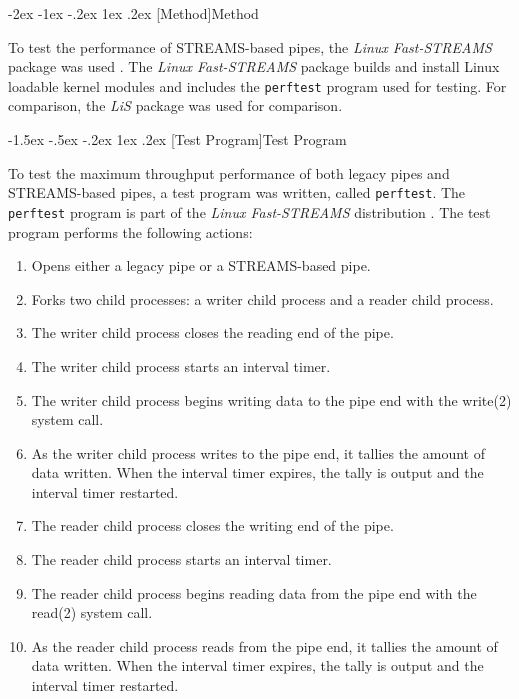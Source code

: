 \documentclass[letterpaper,final,notitlepage,twocolumn,10pt,twoside]{article}
\makeatletter
\renewcommand\section{\@startsection {section}{1}{\z@}%
                                   {-2ex \@plus -1ex \@minus -.2ex}%
                                   {1ex \@plus .2ex}%
                                   {\normalfont\large\bfseries}}
\renewcommand\subsection{\@startsection{subsection}{2}{\z@}%
                                     {-1.5ex \@plus -.5ex \@minus -.2ex}%
                                     {1ex \@plus .2ex}%
                                     {\normalfont\normalsize\bfseries}}
\makeatother
\begin{document}
\section[Method]{Method}

To test the performance of STREAMS-based pipes, the \textsl{Linux Fast-STREAMS} package was used
\cite[]{LfS}.  The \textsl{Linux Fast-STREAMS} package builds and install Linux loadable kernel
modules and includes the
\texttt{perftest} program used for testing.  For comparison, the \textsl{LiS} package \cite[]{LiS}
was used for comparison.

\subsection[Test Program]{Test Program}

To test the maximum throughput performance of both legacy pipes and STREAMS-based pipes, a test
program was written, called \texttt{perftest}.  The \texttt{perftest} program is part of the
\textsl{Linux Fast-STREAMS} distribution \cite[]{LfS}.  The test program performs the following
actions:

\begin{enumerate}

\item Opens either a legacy pipe or a STREAMS-based pipe.

\item Forks two child processes: a writer child process and a reader child process.

\item The writer child process closes the reading end of the pipe.

\item The writer child process starts an interval timer.

\item The writer child process begins writing data to the pipe end with the write(2) system call.

\item As the writer child process writes to the pipe end, it tallies the amount of data written.
When the interval timer expires, the tally is output and the interval timer restarted.

\item The reader child process closes the writing end of the pipe.

\item The reader child process starts an interval timer.

\item The reader child process begins reading data from the pipe end with the read(2) system call.

\item As the reader child process reads from the pipe end, it tallies the amount of data written.
When the interval timer expires, the tally is output and the interval timer restarted.

\end{enumerate}
\end{document}

